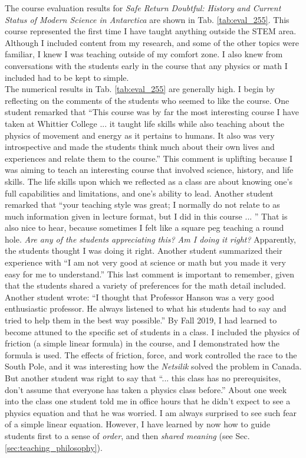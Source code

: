 \documentclass[../../../main.tex]{subfiles}
\begin{document}
The course evaluation results for \textit{Safe Return Doubtful: History and Current Status of Modern Science in Antarctica} are shown in Tab. \ref{tab:eval_255}.  This course represented the first time I have taught anything outside the STEM area.  Although I included content from my research, and some of the other topics were familiar, I knew I was teaching outside of my comfort zone.  I also knew from conversations with the students early in the course that any physics or math I included had to be kept to simple.
\\
\vspace{0.25cm}
The numerical results in Tab. \ref{tab:eval_255} are generally high.  I begin by reflecting on the comments of the students who seemed to like the course.  One student remarked that ``This course was by far the most interesting course I have taken at Whittier College ... it taught life skills while also teaching about the physics of movement and energy as it pertains to humans.  It also was very introspective and made the students think much about their own lives and experiences and relate them to the course.''  This comment is uplifting because I was aiming to teach an interesting course that involved science, history, and life skills.  The life skills upon which we reflected as a class are about knowing one's full capabilities and limitations, and one's ability to lead.  Another student remarked that ``your teaching style was great; I normally do not relate to as much information given in lecture format, but I did in this course ... ''  That is also nice to hear, because sometimes I felt like a square peg teaching a round hole.  \textit{Are any of the students appreciating this?  Am I doing it right?}  Apparently, the students thought I was doing it right.  Another student summarized their experience with ``I am not very good at science or math but you made it very easy for me to understand.''  This last comment is important to remember, given that the students shared a variety of preferences for the math detail included.
\\
\vspace{0.25cm}
Another student wrote: ``I thought that Professor Hanson was a very good enthusiastic professor. He always listened to what his students had to say and tried to help them in the best way possible.'' By Fall 2019, I had learned to become attuned to the specific set of students in a class.  I included the physics of friction (a simple linear formula) in the course, and I demonstrated how the formula is used.  The effects of friction, force, and work controlled the race to the South Pole, and it was interesting how the \textit{Netsilik} solved the problem in Canada.  But another student was right to say that ``... this class has no prerequisites, don't assume that everyone has taken a physics class before.''  About one week into the class one student told me in office hours that he didn't expect to see a physics equation and that he was worried.  I am always surprised to see such fear of a simple linear equation.  However, I have learned by now how to guide students first to a sense of \textit{order}, and then \textit{shared meaning} (see Sec. \ref{sec:teaching_philosophy}).
\end{document}
